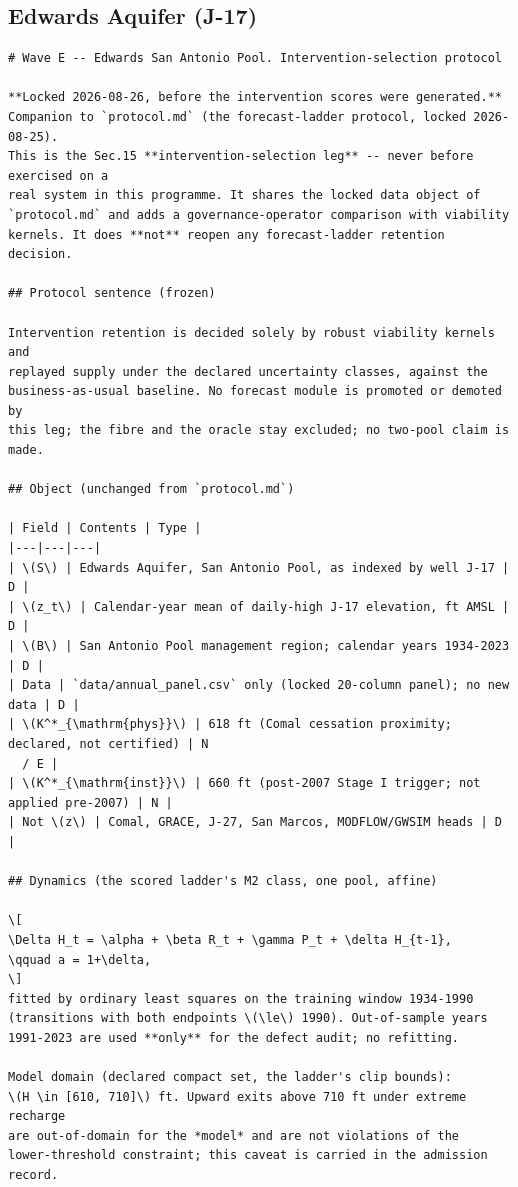 \subsection{Edwards Aquifer (J-17)}
\begin{footnotesize}\begin{verbatim}
# Wave E -- Edwards San Antonio Pool. Intervention-selection protocol

**Locked 2026-08-26, before the intervention scores were generated.**
Companion to `protocol.md` (the forecast-ladder protocol, locked 2026-08-25).
This is the Sec.15 **intervention-selection leg** -- never before exercised on a
real system in this programme. It shares the locked data object of
`protocol.md` and adds a governance-operator comparison with viability
kernels. It does **not** reopen any forecast-ladder retention decision.

## Protocol sentence (frozen)

Intervention retention is decided solely by robust viability kernels and
replayed supply under the declared uncertainty classes, against the
business-as-usual baseline. No forecast module is promoted or demoted by
this leg; the fibre and the oracle stay excluded; no two-pool claim is made.

## Object (unchanged from `protocol.md`)

| Field | Contents | Type |
|---|---|---|
| \(S\) | Edwards Aquifer, San Antonio Pool, as indexed by well J-17 | D |
| \(z_t\) | Calendar-year mean of daily-high J-17 elevation, ft AMSL | D |
| \(B\) | San Antonio Pool management region; calendar years 1934-2023 | D |
| Data | `data/annual_panel.csv` only (locked 20-column panel); no new data | D |
| \(K^*_{\mathrm{phys}}\) | 618 ft (Comal cessation proximity; declared, not certified) | N
  / E |
| \(K^*_{\mathrm{inst}}\) | 660 ft (post-2007 Stage I trigger; not applied pre-2007) | N |
| Not \(z\) | Comal, GRACE, J-27, San Marcos, MODFLOW/GWSIM heads | D |

## Dynamics (the scored ladder's M2 class, one pool, affine)

\[
\Delta H_t = \alpha + \beta R_t + \gamma P_t + \delta H_{t-1},
\qquad a = 1+\delta,
\]
fitted by ordinary least squares on the training window 1934-1990
(transitions with both endpoints \(\le\) 1990). Out-of-sample years
1991-2023 are used **only** for the defect audit; no refitting.

Model domain (declared compact set, the ladder's clip bounds):
\(H \in [610, 710]\) ft. Upward exits above 710 ft under extreme recharge
are out-of-domain for the *model* and are not violations of the
lower-threshold constraint; this caveat is carried in the admission record.


\end{verbatim}
\end{footnotesize}
